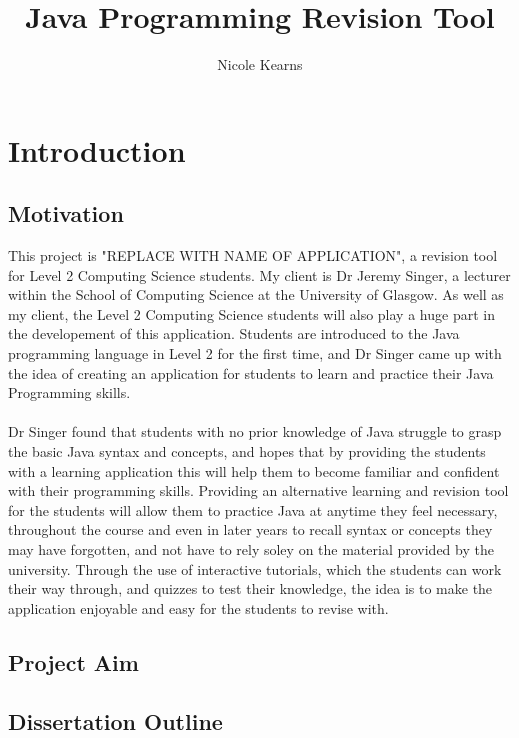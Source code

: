 \documentclass{article}
\begin{document}
\title{Java Programming Revision Tool}
\author{Nicole Kearns}
\maketitle
\tableofcontents

\newpage

\section{Introduction}

\subsection{Motivation}

This project is "REPLACE WITH NAME OF APPLICATION", a revision tool for Level 2 Computing Science students. My client is Dr Jeremy Singer, a lecturer within the School of Computing Science at the University of Glasgow. As well as my client, the Level 2 Computing Science students will also play a huge part in the developement of this application. Students are introduced to the Java programming language in Level 2 for the first time, and Dr Singer came up with the idea of creating an application for students to learn and practice their Java Programming skills.\\
\\
Dr Singer found that students with no prior knowledge of Java struggle to grasp the basic Java syntax and concepts, and hopes that by providing the students with a learning application this will help them to become familiar and confident with their programming skills. Providing an alternative learning and revision tool for the students will allow them to practice Java at anytime they feel necessary, throughout the course and even in later years to recall syntax or concepts they may have forgotten, and not have to rely soley on the material provided by the university. Through the use of interactive tutorials, which the students can work their way through, and quizzes to test their knowledge, the idea is to make the application enjoyable and easy for the students to revise with.

\subsection{Project Aim}

\subsection{Dissertation Outline}
\end{document}
